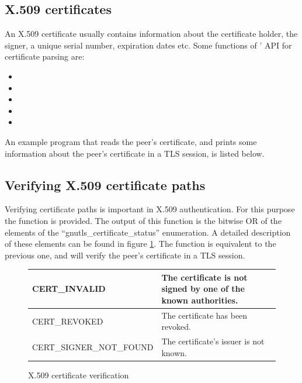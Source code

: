 \subsection{X.509 certificates}
An X.509 certificate usually contains information about the certificate
holder, the signer, a unique serial number, expiration dates etc. Some
functions of \gnutls{}' API for certificate parsing are:
\begin{itemize}
\item {}
\item {}
\item {}
\item {}
\item {}
\end{itemize}

\par
An example program that reads the peer's certificate,
and prints some information about the peer's certificate in a TLS session,
is listed below.




\subsection{Verifying X.509 certificate paths}
Verifying certificate paths is important 
in X.509 authentication. For this purpose the function
 is provided. The
output of this function is the bitwise OR of the elements of the
``gnutls\_certificate\_status'' enumeration. A detailed description of
these elements can be found in figure \ref{fig:verify}.
The function 
is equivalent to the previous one, and will verify the peer's certificate in a TLS session.

\begin{figure}[hbtp]
\begin{tabular}{|l|p{9cm}|}

\hline
CERT\_INVALID & The certificate is not signed by one of the known authorities.
\\
\hline
CERT\_REVOKED & The certificate has been revoked.
\\
\hline
CERT\_SIGNER\_NOT\_FOUND & The certificate's issuer is not known.
\\
\hline
\end{tabular}
\caption{X.509 certificate verification}
\label{fig:verify}
\end{figure}

